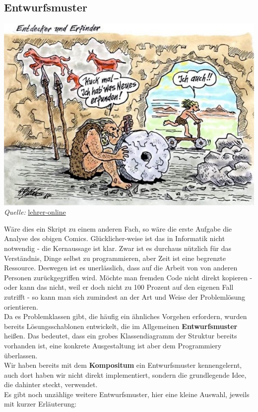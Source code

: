 \documentclass{article}
\begin{document}
\subsection{Entwurfsmuster}

\begin{center}
    \includegraphics[scale=0.5]{../media/cartoon_rad.jpg} \\
    \textit{Quelle:} \href{https://www.lehrer-online.de/artikel/fa/cartoon-der-woche-entdecker-und-erfinder/#}{lehrer-online}
\end{center}

Wäre dies ein Skript zu einem anderen Fach, so wäre die erste Aufgabe die Analyse des obigen Comics. Glücklicher-weise ist das in Informatik nicht notwendig - die Kernaussage ist klar. Zwar ist es durchaus nützlich für das Verständnis, Dinge selbst zu programmieren, aber Zeit ist eine begrenzte Ressource. Deswegen ist es unerlässlich, dass auf die Arbeit von von anderen Personen zurückgegriffen wird. Möchte man fremden Code nicht direkt kopieren - oder kann das nicht, weil er doch nicht zu 100 Prozent auf den eigenen Fall zutrifft - so kann man sich zumindest an der Art und Weise der Problemlösung orientieren. \\
Da es Problemklassen gibt, die häufig ein ähnliches Vorgehen erfordern, wurden bereits Lösungsschablonen entwickelt, die im Allgemeinen \textbf{Entwurfsmuster} heißen. Das bedeutet, dass ein grobes Klassendiagramm der Struktur bereits vorhanden ist, eine konkrete Ausgestaltung ist aber dem Programmiery überlassen. \\
Wir haben bereits mit dem \textbf{Kompositum} ein Entwurfsmuster kennengelernt, auch dort haben wir nicht direkt  implementiert, sondern die grundlegende Idee, die dahinter steckt, verwendet. \\
Es gibt noch unzählige weitere Entwurfsmuster, hier eine kleine Auswahl, jeweils mit kurzer Erläuterung:
\end{document}

